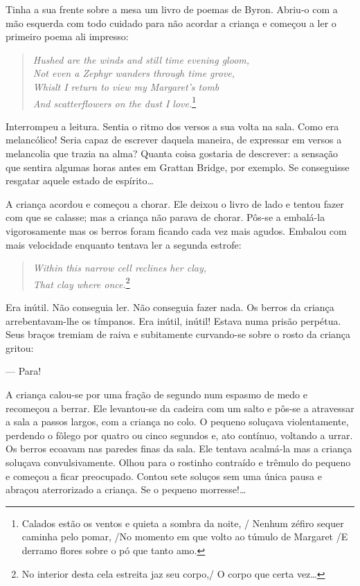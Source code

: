 Tinha a sua frente sobre a mesa um livro de poemas de Byron. Abriu-o
com a mão esquerda com todo cuidado para não acordar a criança e
começou a ler o primeiro poema ali impresso:

\begin{verse}{\itshape
Hushed are the winds and still time evening gloom,\\
Not even a Zephyr wanders through time grove,\\
Whislt I return to view my Margaret's tomb\\
And scatterflowers on the dust I love.}\footnote{ Calados estão os ventos e quieta a sombra da noite, / Nenhum
zéfiro sequer caminha pelo pomar, /No momento em que volto ao
túmulo de Margaret /E derramo flores sobre o pó que tanto amo.}
\end{verse}

Interrompeu a leitura. Sentia o ritmo dos versos a sua volta na sala.
Como era melancólico! Seria capaz de escrever daquela maneira, de
expressar em versos a melancolia que trazia na
alma? Quanta coisa gostaria de descrever: a sensação que sentira
algumas horas antes em Grattan Bridge, por exemplo. Se conseguisse
resgatar aquele estado de espírito\ldots{}

A criança acordou e começou a chorar. Ele deixou o livro de lado e
tentou fazer com que se calasse; mas a criança não parava de chorar.
Pôs-se a embalá-la vigorosamente mas os berros foram ficando cada vez
mais agudos. Embalou com mais velocidade enquanto tentava ler a
segunda estrofe:

\begin{verse}{\itshape
Within this narrow cell reclines her clay,\\ That clay where
once.}\footnote{ No interior desta cela estreita jaz seu corpo,/ O corpo
que certa vez\ldots{}}
\end{verse}

Era inútil. Não conseguia ler. Não conseguia fazer nada. Os berros
da criança arrebentavam-lhe os tímpanos. Era inútil, inútil! Estava
numa prisão perpétua. Seus braços tremiam de raiva e subitamente
curvando-se sobre o rosto da criança gritou:

--- Para!

A criança calou-se por uma fração de segundo num espasmo de medo e
recomeçou a berrar. Ele levantou-se da cadeira com um salto e pôs-se a
atravessar a sala a passos largos, com a criança no colo. O pequeno
soluçava violentamente, perdendo o fôlego por quatro ou cinco
segundos e, ato contínuo, voltando a urrar. Os berros ecoavam nas
paredes finas da sala. Ele tentava acalmá-la mas a criança soluçava
convulsivamente. Olhou para o rostinho contraído e trêmulo do pequeno
e começou a ficar preocupado. Contou sete soluços sem uma única pausa
e abraçou aterrorizado a criança. Se o pequeno morresse!\ldots{}

